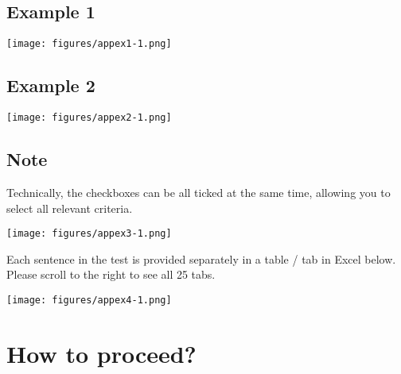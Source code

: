 \subsection*{Example 1}


\noindent
\texttt{[image: figures/appex1-1.png]}

\subsection*{Example 2}


\texttt{[image: figures/appex2-1.png]}

\subsection*{Note}

\begin{minipage}[t]{.5\textwidth}
Technically, the checkboxes can be all ticked at the same time, allowing you to select all relevant criteria.
\end{minipage}
\hfill
\begin{minipage}[t]{.45\textwidth}
\strut\vspace*{-\baselineskip}\newline\texttt{[image: figures/appex3-1.png]}
 \end{minipage}

\medskip
\noindent
Each sentence in the test is provided separately in a table / tab in Excel below. Please scroll to the right to see all 25 tabs.

\noindent
\texttt{[image: figures/appex4-1.png]}


\section*{How to proceed?}




